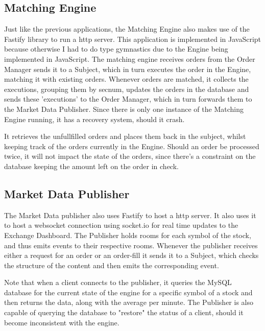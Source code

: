 \documentclass{article}
\begin{document}
\subsection{Matching Engine}
Just like the previous applications, the Matching Engine also makes use of the Fastify library to run a http server. This application is implemented in JavaScript because otherwise I had to do type gymnastics due to the Engine being implemented in JavaScript.
The matching engine receives orders from the Order Manager sends it to a Subject, which in turn executes the order in the Engine, matching it with existing orders.
Whenever orders are matched, it collects the executions, grouping them by secnum, updates the orders in the database and sends these 'executions' to the Order Manager, which in turn forwards them to the Market Data Publisher.
Since there is only one instance of the Matching Engine running, it has a recovery system, should it crash.
\par
It retrieves the unfullfilled orders and places them back in the subject, whilst keeping track of the orders currently in the Engine.
Should an order be processed twice, it will not impact the state of the orders, since there's a constraint on the database keeping the amount left on the order in check.
\subsection{Market Data Publisher}
The Market Data publisher also uses Fastify to host a http server.
It also uses it to host a websocket connection using socket.io for real time updates to the Exchange Dashboard.
The Publisher holds rooms for each symbol of the stock, and thus emits events to their respective rooms.
Whenever the publisher receives either a request for an order or an order-fill it sends it to a Subject, which checks the structure of the content and then emits the corresponding event.
\par
Note that when a client connects to the publisher, it queries the MySQL database for the current state of the engine for a specific symbol of a stock and then returns the data, along with the average per minute.
The Publisher is also capable of querying the database to "restore" the status of a client, should it become inconsistent with the engine.
\end{document}
